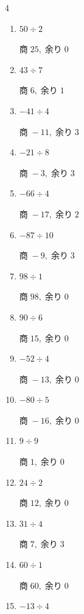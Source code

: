 \begin{multicols}{4}
\begin{enumerate}
        $商\; -1,\; 余り\; 3$

  \item $50 \div 2$

        $商\; 25,\; 余り\; 0$

  \item $43 \div 7$

        $商\; 6,\; 余り\; 1$

  \item $-41 \div 4$

        $商\; -11,\; 余り\; 3$

  \item $-21 \div 8$

        $商\; -3,\; 余り\; 3$

\columnbreak %

  \item $-66 \div 4$

        $商\; -17,\; 余り\; 2$

  \item $-87 \div 10$

        $商\; -9,\; 余り\; 3$

  \item $98 \div 1$

        $商\; 98,\; 余り\; 0$

  \item $90 \div 6$

        $商\; 15,\; 余り\; 0$

  \item $-52 \div 4$

        $商\; -13,\; 余り\; 0$

  \item $-80 \div 5$

        $商\; -16,\; 余り\; 0$

  \item $9 \div 9$

        $商\; 1,\; 余り\; 0$

  \item $24 \div 2$

        $商\; 12,\; 余り\; 0$

  \item $31 \div 4$

        $商\; 7,\; 余り\; 3$

  \item $60 \div 1$

        $商\; 60,\; 余り\; 0$

  \item $-13 \div 4$


\end{enumerate}
\end{multicols}
